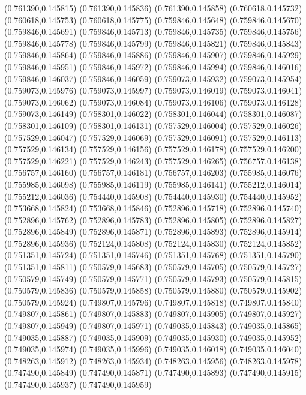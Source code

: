 (0.761390,0.145815)
(0.761390,0.145836)
(0.761390,0.145858)
(0.760618,0.145732)
(0.760618,0.145753)
(0.760618,0.145775)
(0.759846,0.145648)
(0.759846,0.145670)
(0.759846,0.145691)
(0.759846,0.145713)
(0.759846,0.145735)
(0.759846,0.145756)
(0.759846,0.145778)
(0.759846,0.145799)
(0.759846,0.145821)
(0.759846,0.145843)
(0.759846,0.145864)
(0.759846,0.145886)
(0.759846,0.145907)
(0.759846,0.145929)
(0.759846,0.145951)
(0.759846,0.145972)
(0.759846,0.145994)
(0.759846,0.146016)
(0.759846,0.146037)
(0.759846,0.146059)
(0.759073,0.145932)
(0.759073,0.145954)
(0.759073,0.145976)
(0.759073,0.145997)
(0.759073,0.146019)
(0.759073,0.146041)
(0.759073,0.146062)
(0.759073,0.146084)
(0.759073,0.146106)
(0.759073,0.146128)
(0.759073,0.146149)
(0.758301,0.146022)
(0.758301,0.146044)
(0.758301,0.146087)
(0.758301,0.146109)
(0.758301,0.146131)
(0.757529,0.146004)
(0.757529,0.146026)
(0.757529,0.146047)
(0.757529,0.146069)
(0.757529,0.146091)
(0.757529,0.146113)
(0.757529,0.146134)
(0.757529,0.146156)
(0.757529,0.146178)
(0.757529,0.146200)
(0.757529,0.146221)
(0.757529,0.146243)
(0.757529,0.146265)
(0.756757,0.146138)
(0.756757,0.146160)
(0.756757,0.146181)
(0.756757,0.146203)
(0.755985,0.146076)
(0.755985,0.146098)
(0.755985,0.146119)
(0.755985,0.146141)
(0.755212,0.146014)
(0.755212,0.146036)
(0.754440,0.145908)
(0.754440,0.145930)
(0.754440,0.145952)
(0.753668,0.145824)
(0.753668,0.145846)
(0.752896,0.145718)
(0.752896,0.145740)
(0.752896,0.145762)
(0.752896,0.145783)
(0.752896,0.145805)
(0.752896,0.145827)
(0.752896,0.145849)
(0.752896,0.145871)
(0.752896,0.145893)
(0.752896,0.145914)
(0.752896,0.145936)
(0.752124,0.145808)
(0.752124,0.145830)
(0.752124,0.145852)
(0.751351,0.145724)
(0.751351,0.145746)
(0.751351,0.145768)
(0.751351,0.145790)
(0.751351,0.145811)
(0.750579,0.145683)
(0.750579,0.145705)
(0.750579,0.145727)
(0.750579,0.145749)
(0.750579,0.145771)
(0.750579,0.145793)
(0.750579,0.145815)
(0.750579,0.145836)
(0.750579,0.145858)
(0.750579,0.145880)
(0.750579,0.145902)
(0.750579,0.145924)
(0.749807,0.145796)
(0.749807,0.145818)
(0.749807,0.145840)
(0.749807,0.145861)
(0.749807,0.145883)
(0.749807,0.145905)
(0.749807,0.145927)
(0.749807,0.145949)
(0.749807,0.145971)
(0.749035,0.145843)
(0.749035,0.145865)
(0.749035,0.145887)
(0.749035,0.145909)
(0.749035,0.145930)
(0.749035,0.145952)
(0.749035,0.145974)
(0.749035,0.145996)
(0.749035,0.146018)
(0.749035,0.146040)
(0.748263,0.145912)
(0.748263,0.145934)
(0.748263,0.145956)
(0.748263,0.145978)
(0.747490,0.145849)
(0.747490,0.145871)
(0.747490,0.145893)
(0.747490,0.145915)
(0.747490,0.145937)
(0.747490,0.145959)
